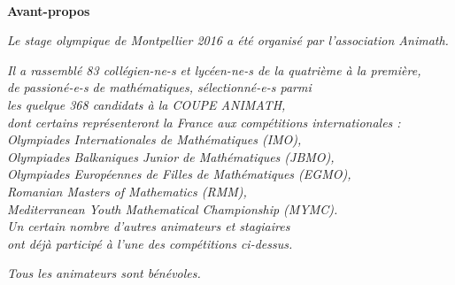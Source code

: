 \pagebreak

\pagestyle{empty}~

 \pagebreak



\clearpage


\begin{flushright}

\textbf{\Large{Avant-propos}}

\bigskip

\emph{Le stage olympique de Montpellier 2016 a été organisé par l'association Animath.}

\bigskip

\emph{Il a rassemblé 83 collégien-ne-s et lycéen-ne-s de la quatrième à la première, \\ de passioné-e-s de mathématiques, sélectionné-e-s parmi \\ les quelque 368 candidats à la COUPE ANIMATH, \\ dont certains  représenteront la France aux compétitions internationales : \\
Olympiades Internationales de Mathématiques (IMO), \\ Olympiades Balkaniques Junior de Mathématiques (JBMO), \\ Olympiades Européennes de Filles de Mathématiques (EGMO), \\ Romanian Masters of Mathematics (RMM), \\ Mediterranean Youth Mathematical Championship (MYMC). \\ Un certain nombre d'autres animateurs et stagiaires \\ ont déjà participé à l'une des compétitions ci-dessus.}
 
\bigskip

\emph{Tous les animateurs sont bénévoles.} 
\end{flushright}




\pagebreak

\mbox { }

\pagebreak
